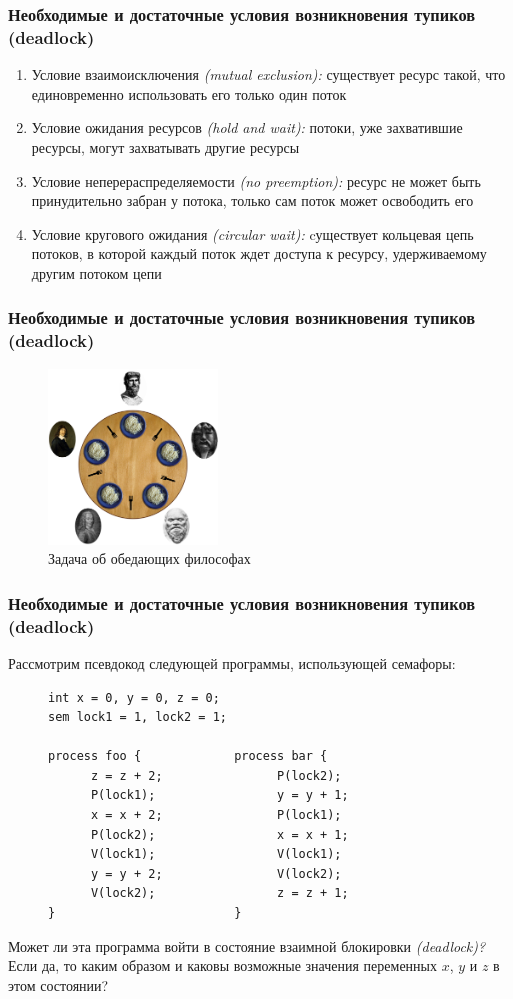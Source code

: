 \documentclass[aspectratio=169, pdf, 8pt, unicode]{beamer}
\begin{document}
\begin{frame}
\frametitle{Необходимые и достаточные условия возникновения тупиков (deadlock)}
\begin{enumerate}
\item Условие взаимоисключения \textit{(mutual exclusion):} существует ресурс такой, что единовременно использовать его только один поток
\item Условие ожидания ресурсов \textit{(hold and wait):} потоки, уже захватившие ресурсы, могут захватывать другие ресурсы
\item Условие неперераспределяемости \textit{(no preemption):} ресурс не может быть принудительно забран у потока, только сам поток может освободить его
\item Условие кругового ожидания \textit{(circular wait):} cуществует кольцевая цепь потоков, в которой каждый поток ждет доступа к ресурсу, удерживаемому другим потоком цепи
\end{enumerate}
\end{frame}

\begin{frame}
\frametitle{Необходимые и достаточные условия возникновения тупиков (deadlock)}
\begin{figure}[H]
      \centering
		\includegraphics[width=0.4\textwidth]{fig/dining_philosophers_problem.png}
      \caption{Задача об обедающих философах}
\end{figure}
\end{frame}

\begin{frame}[fragile]
\frametitle{Необходимые и достаточные условия возникновения тупиков (deadlock)}
Рассмотрим псевдокод следующей программы, использующей семафоры:
\begin{figure}[H]
\centering
\begin{BVerbatim}
int x = 0, y = 0, z = 0;
sem lock1 = 1, lock2 = 1;

process foo {             process bar {
      z = z + 2;                P(lock2);
      P(lock1);                 y = y + 1;
      x = x + 2;                P(lock1);
      P(lock2);                 x = x + 1;
      V(lock1);                 V(lock1);
      y = y + 2;                V(lock2);
      V(lock2);                 z = z + 1;
}                         }
\end{BVerbatim}
\end{figure}
Может ли эта программа войти в состояние взаимной блокировки \textit{(deadlock)?} Если да, то каким образом и каковы возможные значения переменных
$x$, $y$ и $z$ в этом состоянии?
\end{frame}
\end{document}
